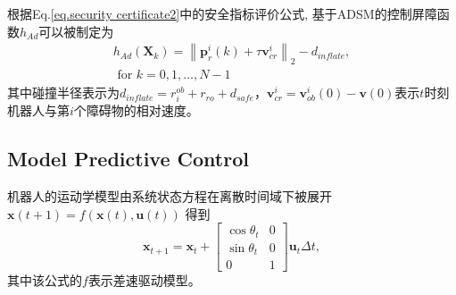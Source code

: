 \documentclass[preprint,5p,times,twocolumn]{elsarticle}
\begin{document}
根据Eq.\ref{eq.security certificate2}中的安全指标评价公式, 基于ADSM的控制屏障函数$h_{Ad}$可以被制定为
\begin{equation}
\label{eq.had}
\begin{aligned}
h_{Ad}\left(\boldsymbol{X}_k\right)=\left\|\boldsymbol{p}_r^i(k)+\tau \boldsymbol{v}_{cr}^i\right\|_2-d_{inflate},\\
\text { for } k=0,1, \ldots, N-1
\end{aligned}
\end{equation}
其中碰撞半径表示为$d_{inflate}=r^{ob}_i+r_{ro}+d_{safe}$，$\boldsymbol{v}_{cr}^i=\boldsymbol{v}_{ob}^i(0)-\boldsymbol{v}(0)$表示$t$时刻机器人与第$i$个障碍物的相对速度。


\subsection{Model Predictive Control}
\label{MPC-section}
机器人的运动学模型由系统状态方程在离散时间域下被展开$\boldsymbol{x}(t+1)=f(\boldsymbol{x}(t), \boldsymbol{u}(t))$ 得到
\begin{equation}
\label{eq.d-model}
\boldsymbol{x}_{t+1}=\boldsymbol{x}_t+\left[\begin{array}{cc}
\cos \theta_t & 0 \\
\sin \theta_t & 0 \\
0 & 1
\end{array}\right] \boldsymbol{u}_t \Delta t,
\end{equation}
其中该公式的$f$表示差速驱动模型。
\end{document}
